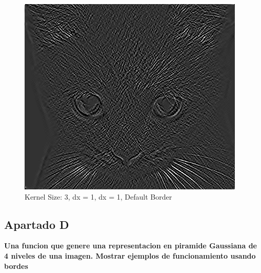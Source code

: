 \documentclass{article}
\begin{document}
\begin{minipage}{\linewidth}
    \centering
    \begin{minipage}{0.45\linewidth}
        \begin{figure}[H]
			\includegraphics[width=\linewidth]{Ejercicio2c/cat(3,2,2)_DEFAULT.png}             			
			\caption{Kernel Size: 3, dx = 1, dx = 1,  Default Border}
        \end{figure}
    \end{minipage}   
\end{minipage}

\subsection*{Apartado D}
\textbf{Una funcion que genere una representacion en piramide Gaussiana de 4 niveles de una imagen. Mostrar ejemplos de funcionamiento usando bordes}
\end{document}

